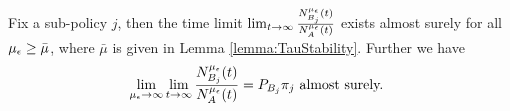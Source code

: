 %
%


%



\begin{thm}
	\label{Thm_PB_for_one_subpolicy}
	Fix a sub-policy $j$, then the time  limit  $ \lim_{t \to \infty} \frac{N_{B_j}^{\mu_\epsilon} (t)}{N_A^{\mu_\epsilon} (t)} $  exists almost surely for all $\mu_{ \epsilon } \ge {\bar \mu}$, where    $ {\bar \mu}$ is given in Lemma \ref{lemma:TauStability}. Further we have
	\begin{eqnarray*}
	\lim\limits_{{\mu_\epsilon} \to \infty } \lim\limits_{t \to \infty }   \frac{N_{B_j}^{\mu_\epsilon} (t)}{N_A^{\mu_\epsilon} (t)} = P_{B_j} {\pi}_j \mbox{ almost surely. }
	 \end{eqnarray*}
\end{thm}
